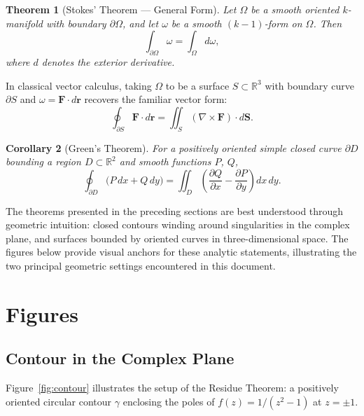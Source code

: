 \documentclass{article}
\newtheorem{theorem}{Theorem}[section]
\newtheorem{corollary}[theorem]{Corollary}
\begin{document}
\begin{theorem}[Stokes' Theorem --- General Form]
  Let $\Omega$ be a smooth oriented $k$-manifold with boundary $\partial\Omega$,
  and let $\omega$ be a smooth $(k-1)$-form on $\Omega$.  Then
  \begin{equation}
    \int_{\partial\Omega} \omega = \int_{\Omega} d\omega,
  \end{equation}
  where $d$ denotes the exterior derivative.
\end{theorem}

In classical vector calculus, taking $\Omega$ to be a surface $S \subset \mathbb{R}^{3}$
with boundary curve $\partial S$ and $\omega = \mathbf{F} \cdot d\mathbf{r}$ recovers
the familiar vector form:
\begin{equation}
  \oint_{\partial S} \mathbf{F} \cdot d\mathbf{r}
    = \iint_{S} (\nabla \times \mathbf{F}) \cdot d\mathbf{S}.
\end{equation}

\begin{corollary}[Green's Theorem]
  For a positively oriented simple closed curve $\partial D$ bounding a region
  $D \subset \mathbb{R}^{2}$ and smooth functions $P$, $Q$,
  \begin{equation}
    \oint_{\partial D} \bigl(P\,dx + Q\,dy\bigr)
      = \iint_{D} \left(\frac{\partial Q}{\partial x}
                       - \frac{\partial P}{\partial y}\right)dx\,dy.
  \end{equation}
\end{corollary}

The theorems presented in the preceding sections are best understood through geometric
intuition: closed contours winding around singularities in the complex plane, and
surfaces bounded by oriented curves in three-dimensional space. The figures below
provide visual anchors for these analytic statements, illustrating the two principal
geometric settings encountered in this document.

\section{Figures}

\subsection{Contour in the Complex Plane}

Figure~\ref{fig:contour} illustrates the setup of the Residue Theorem: a positively
oriented circular contour $\gamma$ enclosing the poles of $f(z) = 1/(z^{2}-1)$
at $z = \pm 1$.
\end{document}

